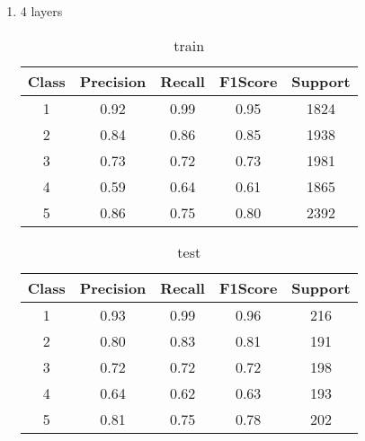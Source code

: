 \begin{enumerate}[label=(\alph*)]
\begin{enumerate}[label=\roman*.]
\begin{table}[!htb]
        \end{table}
        \newpage
        \item 4 layers
        \begin{table}[!htb]
            \centering
            \begin{tabular}{ccccc}
            \hline
            Class & Precision & Recall & F1Score & Support \\ \hline
            1     & 0.92      & 0.99   & 0.95    & 1824    \\
            2     & 0.84      & 0.86   & 0.85    & 1938    \\
            3     & 0.73      & 0.72   & 0.73    & 1981    \\
            4     & 0.59      & 0.64   & 0.61    & 1865    \\
            5     & 0.86      & 0.75   & 0.80    & 2392    \\ \hline
            \end{tabular}
            \caption{train}
            \label{part e train depth 4}
        \end{table}
        \begin{table}[!htb]
            \centering
            \begin{tabular}{ccccc}
            \hline
            Class & Precision & Recall & F1Score & Support \\ \hline
            1     & 0.93      & 0.99   & 0.96    & 216     \\
            2     & 0.80      & 0.83   & 0.81    & 191     \\
            3     & 0.72      & 0.72   & 0.72    & 198     \\
            4     & 0.64      & 0.62   & 0.63    & 193     \\
            5     & 0.81      & 0.75   & 0.78    & 202     \\ \hline
            \end{tabular}
            \caption{test}
            \label{part e test depth 4}
        \end{table}
        

\end{enumerate}
\end{enumerate}

